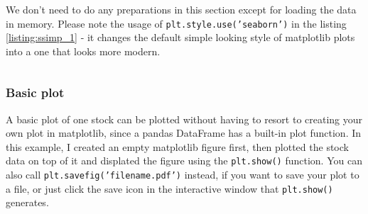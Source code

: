 \documentclass[12pt, a4paper]{article}
\begin{document}
\bgroup
  \inputminted[linenos, breaklines=true, fontsize=\scriptsize]{python}{src/stocks/simple/0_imports.py}
  \label{listing:ssimp_0_imports}
\egroup


We don't need to do any preparations in this section except for loading the data in memory. Please note the usage of \texttt{plt.style.use('seaborn')} in the listing \ref{listing:ssimp_1} - it changes the default simple looking style of matplotlib plots into a one that looks more modern.

\bgroup
  \inputminted[linenos, breaklines=true, fontsize=\scriptsize, firstnumber=last]{python}{src/stocks/simple/1_get_data.py}
  \label{listing:ssimp_1}
\egroup

\subsubsection{Basic plot}

A basic plot of one stock can be plotted without having to resort to creating your own plot in matplotlib, since a pandas DataFrame has a built-in plot function. In this example, I created an empty matplotlib figure first, then plotted the stock data on top of it and displated the figure using the \texttt{plt.show()} function. You can also call \texttt{plt.savefig('filename.pdf')} instead, if you want to save your plot to a file, or just click the save icon in the interactive window that \texttt{plt.show()} generates.

\bgroup
  \inputminted[linenos, breaklines=true, fontsize=\scriptsize, firstnumber=last]{python}{src/stocks/simple/2_onestock.py}
  \label{listing:ssimp_2}
\egroup
\end{document}

